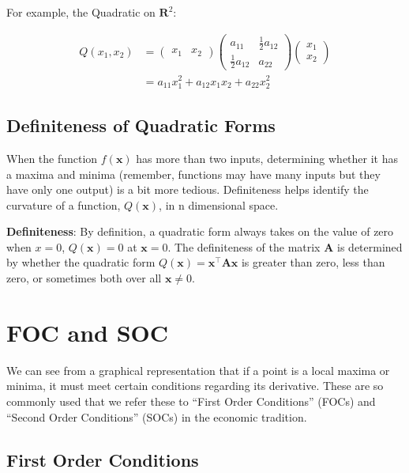 \documentclass[]{book}
\theoremstyle{definition}
\theoremstyle{definition}
\theoremstyle{definition}
\theoremstyle{remark}
\begin{document}
For example, the Quadratic on \(\mathbf{R}^2\):

\begin{align*}
  Q(x_1,x_2)&=\begin{pmatrix} x_1& x_2 \end{pmatrix} \begin{pmatrix} a_{11}&\frac{1}{2} a_{12}\\
  \frac{1}{2}a_{12}&a_{22}\end{pmatrix} \begin{pmatrix} x_1\\x_2 \end{pmatrix} \\
  &= a_{11}x_1^2 + a_{12}x_1x_2 + a_{22}x_2^2
\end{align*}

\subsection*{Definiteness of Quadratic
Forms}\label{definiteness-of-quadratic-forms}

When the function \(f(\mathbf{x})\) has more than two inputs,
determining whether it has a maxima and minima (remember, functions may
have many inputs but they have only one output) is a bit more tedious.
Definiteness helps identify the curvature of a function,
\(Q(\textbf{x})\), in n dimensional space.

\textbf{Definiteness}: By definition, a quadratic form always takes on
the value of zero when \(x = 0\), \(Q(\textbf{x})=0\) at
\(\textbf{x}=0\). The definiteness of the matrix \(\textbf{A}\) is
determined by whether the quadratic form
\(Q(\textbf{x})=\textbf{x}^\top\textbf{A}\textbf{x}\) is greater than
zero, less than zero, or sometimes both over all \(\mathbf{x}\ne 0\).

\section{FOC and SOC}\label{foc-and-soc}

We can see from a graphical representation that if a point is a local
maxima or minima, it must meet certain conditions regarding its
derivative. These are so commonly used that we refer these to ``First
Order Conditions'' (FOCs) and ``Second Order Conditions'' (SOCs) in the
economic tradition.

\subsection*{First Order Conditions}\label{first-order-conditions}
\end{document}
